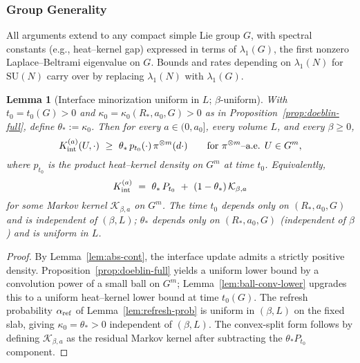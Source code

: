 \documentclass[11pt]{amsart}
\theoremstyle{plain}
\newtheorem{lemma}[theorem]{Lemma}
\theoremstyle{definition}
\theoremstyle{remark}
\begin{document}
\subsubsection*{Group Generality}
All arguments extend to any compact simple Lie group $G$, with spectral constants (e.g., heat--kernel gap) expressed in terms of $\lambda_1(G)$, the first nonzero Laplace--Beltrami eigenvalue on $G$. Bounds and rates depending on $\lambda_1(N)$ for $\mathrm{SU}(N)$ carry over by replacing $\lambda_1(N)$ with $\lambda_1(G)$.
\begin{lemma}[Interface minorization uniform in $L$; $\beta$-uniform]\label{lem:beta-L-independent-minorization}
With $t_0=t_0(G)>0$ and $\kappa_0=\kappa_0(R_*,a_0,G)>0$ as in Proposition~\ref{prop:doeblin-full}, define $\theta_*:=\kappa_0$. Then for every $a\in(0,a_0]$, every volume $L$, and every $\beta\ge 0$,
\[
  K_{\rm int}^{(a)}(U,\cdot)\ \ge\ \theta_*\, p_{t_0}(\cdot)\,\pi^{\otimes m}(d\cdot)\qquad\text{for $\pi^{\otimes m}$--a.e. $U\in G^m$,}
\]
where $p_{t_0}$ is the product heat--kernel density on $G^m$ at time $t_0$. Equivalently,
\[
  K_{\rm int}^{(a)}\ =\ \theta_*\,P_{t_0}\ +\ (1-\theta_*)\,\mathcal K_{\beta,a}
\]
for some Markov kernel $\mathcal K_{\beta,a}$ on $G^m$. The time $t_0$ depends only on $(R_*,a_0,G)$ and is independent of $(\beta,L)$; $\theta_*$ depends only on $(R_*,a_0,G)$ (independent of $\beta$) and is uniform in $L$.
\end{lemma}

\begin{proof}
By Lemma~\ref{lem:abs-cont}, the interface update admits a strictly positive density. Proposition~\ref{prop:doeblin-full} yields a uniform lower bound by a convolution power of a small ball on $G^m$; Lemma~\ref{lem:ball-conv-lower} upgrades this to a uniform heat--kernel lower bound at time $t_0(G)$. The refresh probability $\alpha_{\rm ref}$ of Lemma~\ref{lem:refresh-prob} is uniform in $(\beta,L)$ on the fixed slab, giving $\kappa_0=\theta_*>0$ independent of $(\beta,L)$. The convex-split form follows by defining $\mathcal K_{\beta,a}$ as the residual Markov kernel after subtracting the $\theta_* P_{t_0}$ component.
\end{proof}
\end{document}
